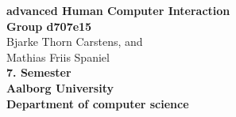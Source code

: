 \vspace*{\fill}

\begin{center}
		\Huge \textbf{advanced Human Computer Interaction}\normalsize \\
\vspace{5mm}
		\textbf{Group d707e15}\\
		Bjarke Thorn Carstens, and \\
		Mathias Friis Spaniel \\
		\textbf{7. Semester}\\
		\textbf{Aalborg University}\\
		\textbf{Department of computer science}
\end{center}

\vspace*{\fill}
